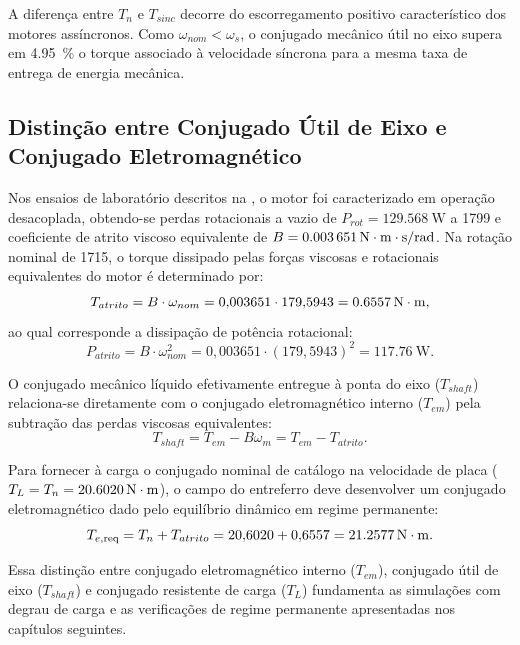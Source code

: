 A diferença entre $T_n$ e $T_{sinc}$ decorre do escorregamento positivo característico dos motores assíncronos. Como $\omega_{nom} < \omega_s$, o conjugado mecânico útil no eixo supera em \SI{4,95}{\percent} o torque associado à velocidade síncrona para a mesma taxa de entrega de energia mecânica.

\subsection{Distinção entre Conjugado Útil de Eixo e Conjugado Eletromagnético}\label{subsec:distincao_torque}

Nos ensaios de laboratório descritos na , o motor foi caracterizado em operação desacoplada, obtendo-se perdas rotacionais a vazio de $P_{rot} = \SI{129,568}{\watt}$ a \SI{1799}{\RPM} e coeficiente de atrito viscoso equivalente de $B = \SI{0,003651}{\mathrm{N\cdot m}\cdot\second/\radian}$. Na rotação nominal de \SI{1715}{\RPM}, o torque dissipado pelas forças viscosas e rotacionais equivalentes do motor é determinado por:
\begin{equation}
T_{atrito} = B \cdot \omega_{nom} = 0{,}003651 \cdot 179{,}5943 = \SI{0,6557}{\mathrm{N\cdot m}},
\label{eq:torque_atrito_nominal}
\end{equation}
ao qual corresponde a dissipação de potência rotacional:
\begin{equation}
P_{atrito} = B \cdot \omega_{nom}^2 = 0{,}003651 \cdot (179{,}5943)^2 = \SI{117,76}{\watt}.
\label{eq:potencia_atrito_nominal}
\end{equation}

O conjugado mecânico líquido efetivamente entregue à ponta do eixo ($T_{shaft}$) relaciona-se diretamente com o conjugado eletromagnético interno ($T_{em}$) pela subtração das perdas viscosas equivalentes:
\begin{equation}
T_{shaft} = T_{em} - B \omega_m = T_{em} - T_{atrito}.
\label{eq:torque_util_eixo}
\end{equation}

Para fornecer à carga o conjugado nominal de catálogo na velocidade de placa ($T_L = T_n = \SI{20,6020}{\mathrm{N\cdot m}}$), o campo do entreferro deve desenvolver um conjugado eletromagnético dado pelo equilíbrio dinâmico em regime permanente:
\begin{equation}
T_{e,\text{req}} = T_n + T_{atrito} = 20{,}6020 + 0{,}6557 = \SI{21,2577}{\mathrm{N\cdot m}}.
\label{eq:torque_total_requerido}
\end{equation}

Essa distinção entre conjugado eletromagnético interno ($T_{em}$), conjugado útil de eixo ($T_{shaft}$) e conjugado resistente de carga ($T_L$) fundamenta as simulações com degrau de carga e as verificações de regime permanente apresentadas nos capítulos seguintes.